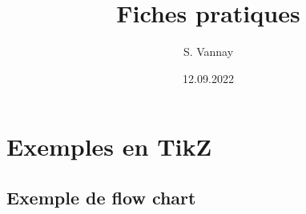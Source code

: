 \documentclass[0pt,a4paper]{report}
\title{Fiches pratiques}
\author{S. Vannay}
\date{12.09.2022}
\begin{document}
\chapterFormat
\chapter*{Exemples en TikZ}





\section{Exemple de flow chart}

\pagestyle{empty}

	
\end{document}
